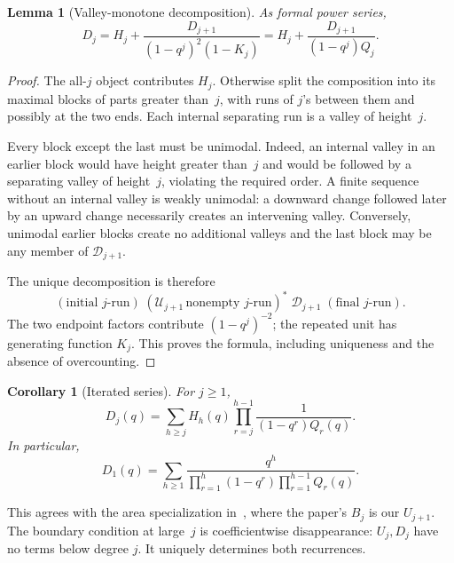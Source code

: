 \documentclass[11pt,a4paper]{article}
\numberwithin{equation}{section}
\newtheorem{lemma}[theorem]{Lemma}
\newtheorem{corollary}[theorem]{Corollary}
\theoremstyle{definition}\newtheorem{definition}[theorem]{Definition}
\theoremstyle{remark}\newtheorem{remark}[theorem]{Remark}
\newcommand{\calD}{\mathcal D}
\newcommand{\calU}{\mathcal U}
\begin{document}
\begin{lemma}[Valley-monotone decomposition]\label{vmb:lem:D}
As formal power series,
\begin{equation}\label{vmb:eq:Drec}
\boxed{\quad D_j=H_j+
 \frac{D_{j+1}}{(1-q^j)^2(1-K_j)}
 =H_j+\frac{D_{j+1}}{(1-q^j)Q_j}.\quad}
\end{equation}
\end{lemma}
\begin{proof}
The all-\(j\) object contributes \(H_j\). Otherwise split the
composition into its maximal blocks of parts greater than~\(j\), with
runs of \(j\)'s between them and possibly at the two ends.
Each internal separating run is a valley of height~\(j\).

Every block except the last must be unimodal. Indeed, an internal valley
in an earlier block would have height greater than~\(j\) and would be
followed by a separating valley of height~\(j\), violating the required
order. A finite sequence without an internal valley is weakly unimodal:
a downward change followed later by an upward change necessarily creates
an intervening valley. Conversely, unimodal earlier blocks create no
additional valleys and the last block may be any member of
\(\calD_{j+1}\).

The unique decomposition is therefore
\[
(\text{initial }j\text{-run})\;
(\calU_{j+1}\,\text{nonempty }j\text{-run})^*\;
\calD_{j+1}\;
(\text{final }j\text{-run}).
\]
The two endpoint factors contribute \((1-q^j)^{-2}\); the repeated unit
has generating function \(K_j\). This proves the formula, including
uniqueness and the absence of overcounting.
\end{proof}

\begin{corollary}[Iterated series]\label{vmb:cor:Dsum}
For \(j\geq1\),
\begin{equation}\label{vmb:eq:Dsum}
D_j(q)=\sum_{h\geq j} H_h(q)
\prod_{r=j}^{h-1}\frac{1}{(1-q^r)Q_r(q)}.
\end{equation}
In particular,
\begin{equation}\label{vmb:eq:paperGF}
D_1(q)=\sum_{h\geq1}
\frac{q^h}{\displaystyle\prod_{r=1}^{h}(1-q^r)
                 \prod_{r=1}^{h-1}Q_r(q)}.
\end{equation}
\end{corollary}
This agrees with the area specialization in~\cite{FRV}, where the
paper's \(B_j\) is our \(U_{j+1}\). The boundary condition at large~\(j\)
is coefficientwise disappearance: \(U_j,D_j\) have no terms below degree
\(j\). It uniquely determines both recurrences.
\end{document}
